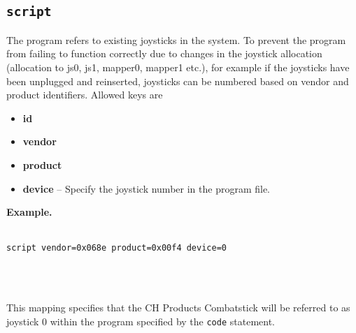 \documentclass{article}
\begin{document}
\subsection{{\tt script}}
The program refers to existing joysticks in the system. To prevent the
program from failing to function correctly due to changes in the
joystick allocation (allocation to js0, js1, mapper0, mapper1 etc.),
for example if the joysticks have been unplugged and reinserted,
joysticks can be numbered based on vendor and product identifiers. Allowed
keys are
\begin{itemize}
	\item {\bf id}
	\item {\bf vendor}
	\item {\bf product}
	\item {\bf device} -- Specify the joystick number in the program file.
\end{itemize}
{\bf Example.}\\
\strut\\
{\tt script vendor=0x068e product=0x00f4 device=0}
\strut\\
\strut\\
This mapping specifies that the CH Products Combatstick will
be referred to as joystick 0 within the program specified
by the {\tt code} statement.
\end{document}
